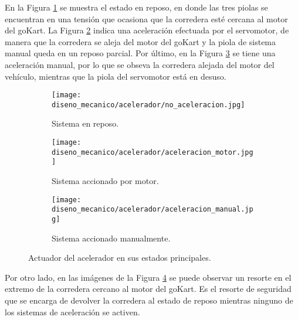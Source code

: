 En la Figura \ref{res_acelerador1} se muestra el estado en reposo, en donde las tres piolas se encuentran en una tensión que ocasiona que la corredera esté cercana al motor del goKart. La Figura \ref{res_acelerador2} indica una aceleración efectuada por el servomotor, de manera que la corredera se aleja del motor del goKart y la piola de sistema manual queda en un reposo parcial. Por último, en la Figura \ref{res_acelerador3} se tiene una aceleración manual, por lo que se obseva la corredera alejada del motor del vehículo, mientras que la piola del servomotor está en desuso.

\begin{figure}[H]
\begin{center}
    \begin{subfigure}{0.45\textwidth}
        \texttt{[image: diseno\_mecanico/acelerador/no\_aceleracion.jpg]} 
        \caption{Sistema en reposo.}
        \label{res_acelerador1}
    \end{subfigure}
    \begin{subfigure}{0.45\textwidth}
        \texttt{[image: diseno\_mecanico/acelerador/aceleracion\_motor.jpg]}
        \caption{Sistema accionado por motor.}
        \label{res_acelerador2}
    \end{subfigure}
    
    \begin{subfigure}{0.45\textwidth}
        \texttt{[image: diseno\_mecanico/acelerador/aceleracion\_manual.jpg]}
        \caption{Sistema accionado manualmente.}
        \label{res_acelerador3}
    \end{subfigure}
    
    \caption{Actuador del acelerador en sus estados principales.}
    \label{res_acelerador}
\end{center}
\end{figure}

Por otro lado, en las imágenes de la Figura \ref{res_acelerador} se puede observar un resorte en el extremo de la corredera cercano al motor del goKart. Es el resorte de seguridad que se encarga de devolver la corredera al estado de reposo mientras ninguno de los sistemas de aceleración se activen.